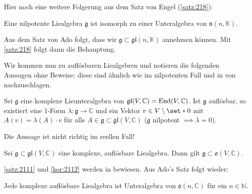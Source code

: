 Hier noch eine weitere Folgerung aus dem Satz von Engel (\ref{satz:218}):

\begin{korollar}[{name=[Nilpotente Liealgebren als Unteralgebra der strikt unteren Dreiecksmatrizen]}]
	Eine nilpotente Liealgebra $\mathfrak{g}$ ist isomorph zu einer Unteralgebra von $\mathfrak{n}(n,\mathbb{K})$.
\end{korollar}
\begin{beweis}
	Aus dem Satz von Ado folgt, dass wir $\mathfrak{g} \subset \mathfrak{gl}(n,\mathbb{K})$ annehmen können. 
	Mit \autoref{satz:218} folgt dann die Behauptung.
\end{beweis}

Wir kommen nun zu auflösbaren Liealgebren und notieren die folgenden Aussagen ohne Beweise; diese sind ähnlich wie im nilpotenten Fall und in  von \textcite{procesiLie} nachzuschlagen.

\begin{satz}[{name={Lie}},label=satz:2111]
	Sei $\mathfrak{g}$ eine komplexe Lieunteralgebra von $\mathfrak{gl}(V,\mathbb{C})=\operatorname{End}(V,\mathbb{C})$.
	Ist $\mathfrak{g}$ auflösbar, so existiert eine 1-Form $\lambda \colon \mathfrak{g} \to \mathbb{C}$ und ein Vektor $v \in V\setminus \set*{0}$ mit $A(v)= \lambda(A) \cdot v$ für alle $A \in \mathfrak{g} \subset \mathfrak{gl}(V,\mathbb{C})$ ($\mathfrak{g}$ nilpotent $\implies \lambda=0$).
\end{satz}

\begin{bemerkung*}[{name=[Gültigkeit des Satzes von Lie]}]
	Die Aussage ist nicht richtig im reellen Fall!
\end{bemerkung*}

\begin{korollar}[label=kor:2112,{name=[komplexe auflösbare Unteralgebra in Dreiecksmatrizen]}]
	Sei $\mathfrak{g} \subset \mathfrak{gl}(V,\mathbb{C})$ eine komplexe, auflösbare Liealgebra.
	Dann gilt $\mathfrak{g} \subset \mathfrak{o}(V,\mathbb{C})$.
\end{korollar}

\autoref{satz:2111} und \autoref{kor:2112} werden in \cite[Sec.~4.6.3]{procesiLie} bewiesen.
Aus Ado's Satz folgt wieder:
\begin{korollar}[label=korr:2113,{name=[jede komplexe auflösbare Unteralgebra in Dreiecksmatrizen]}]
	Jede komplexe auflösbare Liealgebra ist Unteralgebra von $\mathfrak{o}(n,\mathbb{C})$ für ein $n \in \mathbb{N}$.
\end{korollar}

